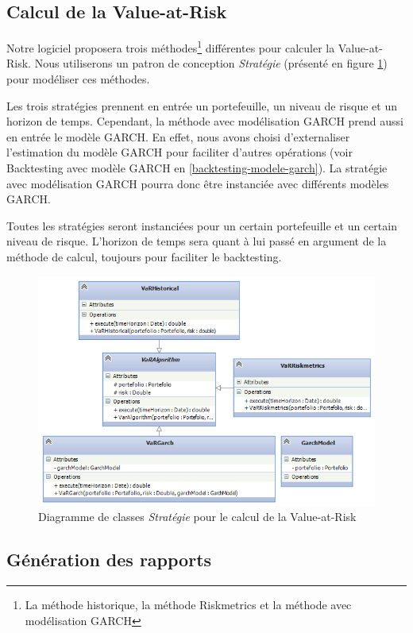 \documentclass[a4paper,titlepage,french]{report}
\begin{document}
\subsection{Calcul de la Value-at-Risk}

Notre logiciel proposera trois méthodes\footnote{La méthode historique, la méthode Riskmetrics et la méthode avec modélisation GARCH} différentes pour calculer la Value-at-Risk.
Nous utiliserons un patron de conception \textit{Stratégie} (présenté en figure \ref{fig:diagramme-classes-var-strategy}) pour modéliser ces méthodes.

Les trois stratégies prennent en entrée un portefeuille, un niveau de risque et un horizon de temps.
Cependant, la méthode avec modélisation GARCH prend aussi en entrée le modèle GARCH.
En effet, nous avons choisi d'externaliser l'estimation du modèle GARCH pour faciliter d'autres opérations (voir Backtesting avec modèle GARCH en \ref{backtesting-modele-garch}).
La stratégie avec modélisation GARCH pourra donc être instanciée avec différents modèles GARCH.

Toutes les stratégies seront instanciées pour un certain portefeuille et un certain niveau de risque.
L'horizon de temps sera quant à lui passé en argument de la méthode de calcul, toujours pour faciliter le backtesting.

\begin{figure}
  	\center
  	\includegraphics[width=1\textwidth]{diagramme-classes-var-strategy.png}
  	\caption{Diagramme de classes \textit{Stratégie} pour le calcul de la Value-at-Risk}
  	\label{fig:diagramme-classes-var-strategy}
\end{figure}


\subsection{Génération des rapports}
\end{document}
